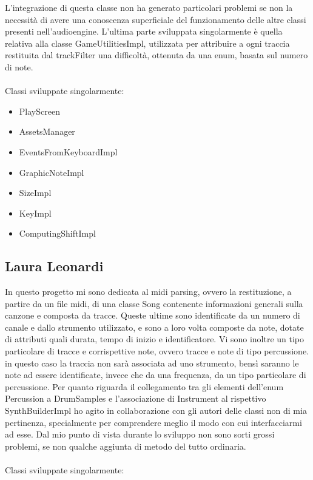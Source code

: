 \documentclass[a4paper,12pt]{report}
\begin{document}
{L'integrazione di questa classe non ha generato particolari problemi se non la necessità di avere una conoscenza superficiale del funzionamento delle altre classi presenti nell'audioengine.
L'ultima parte sviluppata singolarmente è quella relativa alla classe GameUtilitiesImpl, utilizzata per attribuire a ogni traccia restituita dal trackFilter una difficoltà, ottenuta da una enum, basata sul numero di note. 
\\ \\
Classi sviluppate singolarmente:
{
	\begin{itemize}
		\item PlayScreen
		\item AssetsManager
		\item EventsFromKeyboardImpl
		\item GraphicNoteImpl
		\item SizeImpl
		\item KeyImpl
		\item ComputingShiftImpl
	\end{itemize}
}
\hfill\break

\subsection{Laura Leonardi}}
In questo progetto mi sono dedicata al midi parsing, ovvero la restituzione, a partire da un file midi, di una classe Song contenente informazioni generali sulla canzone e composta da tracce. Queste ultime sono identificate da un numero di canale e dallo strumento utilizzato, e sono a loro volta composte da note, dotate di attributi quali durata, tempo di inizio e identificatore. Vi sono inoltre un tipo particolare di tracce e corrispettive note, ovvero tracce e note di tipo percussione. in questo caso la traccia non sarà associata ad uno strumento, bensì saranno le note ad essere identificate, invece che da una frequenza, da un tipo particolare di percussione. Per quanto riguarda il collegamento tra gli elementi dell'enum Percussion a DrumSamples e l'associazione di Instrument al rispettivo SynthBuilderImpl ho agito in collaborazione con gli autori delle classi non di mia pertinenza, specialmente per comprendere meglio il modo con cui interfacciarmi ad esse. Dal mio punto di vista durante lo sviluppo non sono sorti grossi problemi, se non qualche aggiunta di metodo del tutto ordinaria.\\ \\
Classi sviluppate singolarmente:
\end{document}
